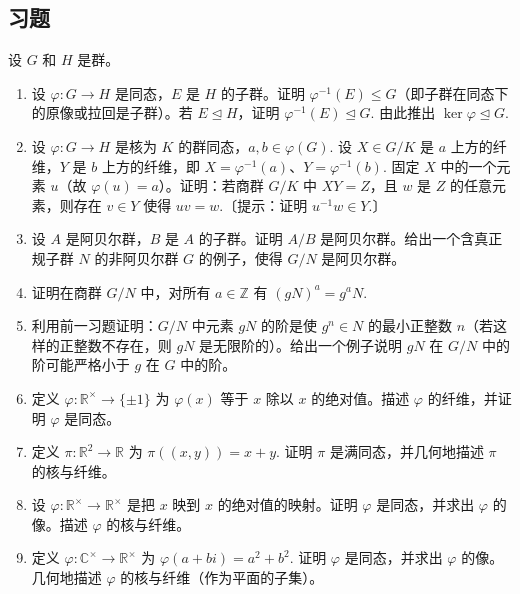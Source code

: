 \subsection*{习题}
设 \(G\) 和 \(H\) 是群。

\begin{enumerate}
\item 设 \(\varphi : G \to H\) 是同态，\(E\) 是 \(H\) 的子群。证明 \(\varphi^{-1}(E) \leq G\)（即子群在同态下的原像或拉回是子群）。若 \(E \trianglelefteq H\)，证明 \(\varphi^{-1}(E) \trianglelefteq G\). 由此推出 \(\ker \varphi \trianglelefteq G\).

\item 设 \(\varphi : G \to H\) 是核为 \(K\) 的群同态，\(a, b \in \varphi(G)\). 设 \(X \in G/K\) 是 \(a\) 上方的纤维，\(Y\) 是 \(b\) 上方的纤维，即 \(X = \varphi^{-1}(a)\)、\(Y = \varphi^{-1}(b)\). 固定 \(X\) 中的一个元素 \(u\)（故 \(\varphi(u) = a\)）。证明：若商群 \(G/K\) 中 \(XY = Z\)，且 \(w\) 是 \(Z\) 的任意元素，则存在 \(v \in Y\) 使得 \(uv = w\).〔提示：证明 \(u^{-1}w \in Y\).〕

\item 设 \(A\) 是阿贝尔群，\(B\) 是 \(A\) 的子群。证明 \(A/B\) 是阿贝尔群。给出一个含真正规子群 \(N\) 的非阿贝尔群 \(G\) 的例子，使得 \(G/N\) 是阿贝尔群。

\item 证明在商群 \(G/N\) 中，对所有 \(a \in \mathbb{Z}\) 有 \((gN)^a = g^a N\).

\item 利用前一习题证明：\(G/N\) 中元素 \(gN\) 的阶是使 \(g^n \in N\) 的最小正整数 \(n\)（若这样的正整数不存在，则 \(gN\) 是无限阶的）。给出一个例子说明 \(gN\) 在 \(G/N\) 中的阶可能严格小于 \(g\) 在 \(G\) 中的阶。

\item 定义 \(\varphi : \mathbb{R}^\times \to \{\pm 1\}\) 为 \(\varphi(x)\) 等于 \(x\) 除以 \(x\) 的绝对值。描述 \(\varphi\) 的纤维，并证明 \(\varphi\) 是同态。

\item 定义 \(\pi : \mathbb{R}^2 \to \mathbb{R}\) 为 \(\pi((x, y)) = x + y\). 证明 \(\pi\) 是满同态，并几何地描述 \(\pi\) 的核与纤维。

\item 设 \(\varphi : \mathbb{R}^\times \to \mathbb{R}^\times\) 是把 \(x\) 映到 \(x\) 的绝对值的映射。证明 \(\varphi\) 是同态，并求出 \(\varphi\) 的像。描述 \(\varphi\) 的核与纤维。

\item 定义 \(\varphi : \mathbb{C}^\times \to \mathbb{R}^\times\) 为 \(\varphi(a + bi) = a^2 + b^2\). 证明 \(\varphi\) 是同态，并求出 \(\varphi\) 的像。几何地描述 \(\varphi\) 的核与纤维（作为平面的子集）。


\end{enumerate}
